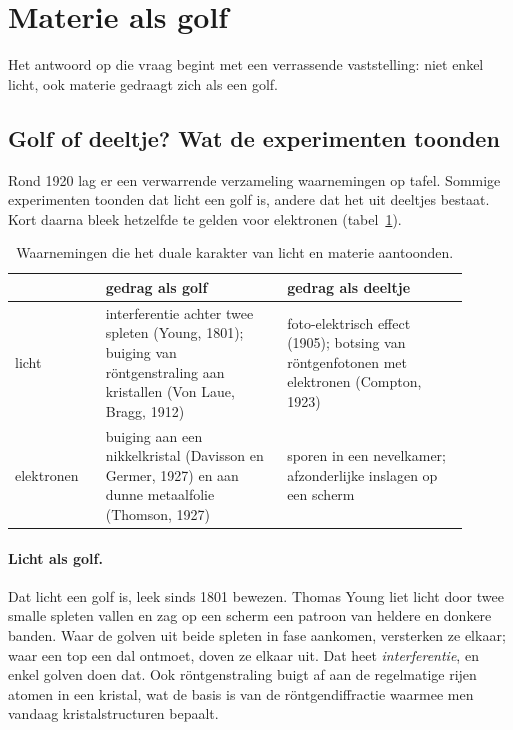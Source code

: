 \section{Materie als golf}
\label{sec:materiegolf}

Het antwoord op die vraag begint met een verrassende vaststelling: niet enkel licht, ook materie gedraagt zich als een golf.

\subsection{Golf of deeltje? Wat de experimenten toonden}

Rond 1920 lag er een verwarrende verzameling waarnemingen op tafel. Sommige experimenten toonden dat licht een golf is, andere dat het uit deeltjes bestaat. Kort daarna bleek hetzelfde te gelden voor elektronen (tabel~\ref{tab:dualiteit}).

\begin{table}[htb]
\centering
\caption{Waarnemingen die het duale karakter van licht en materie aantoonden.}
\label{tab:dualiteit}
\begin{tabular}{p{0.18\linewidth}p{0.36\linewidth}p{0.36\linewidth}}
\toprule
 & gedrag als golf & gedrag als deeltje \\
\midrule
licht & interferentie achter twee spleten (Young, 1801); buiging van röntgenstraling aan kristallen (Von Laue, Bragg, 1912) & foto-elektrisch effect (1905); botsing van röntgenfotonen met elektronen (Compton, 1923) \\
elektronen & buiging aan een nikkelkristal (Davisson en Germer, 1927) en aan dunne metaalfolie (Thomson, 1927) & sporen in een nevelkamer; afzonderlijke inslagen op een scherm \\
\bottomrule
\end{tabular}
\end{table}

\paragraph{Licht als golf.} Dat licht een golf is, leek sinds 1801 bewezen. Thomas Young liet licht door twee smalle spleten vallen en zag op een scherm een patroon van heldere en donkere banden. Waar de golven uit beide spleten in fase aankomen, versterken ze elkaar; waar een top een dal ontmoet, doven ze elkaar uit. Dat heet \emph{interferentie}, en enkel golven doen dat. Ook röntgenstraling buigt af aan de regelmatige rijen atomen in een kristal, wat de basis is van de röntgendiffractie waarmee men vandaag kristalstructuren bepaalt.

